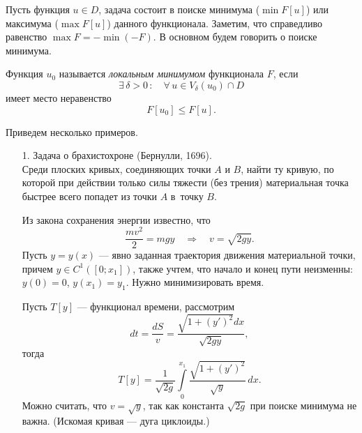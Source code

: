 \documentclass[12pt,a5paper]{book}
\begin{document}
	Пусть функция $u \in D$, задача состоит в поиске минимума ($\min{F[u]}$) или максимума ($\max{F[u]}$) данного функционала. Заметим, что справедливо равенство $\max{F} = -\min{(-F)}$. В основном будем говорить о поиске минимума.
	
	Функция $u_0$ называется \emph{локальным минимумом} функционала $F$, если
	\begin{equation*}
		\exists\,\delta > 0\,: \quad \forall\,u \in V_\delta(u_0) \cap D
	\end{equation*}
	имеет место неравенство
	\begin{equation*}
		F[u_0] \leq F[u].
	\end{equation*}

	Приведем несколько примеров.
	\begin{itemize}
		\item [1.] Задача о брахистохроне (Бернулли, 1696).\\
		Среди плоских кривых, соединяющих точки $A$ и $B$, найти ту кривую, по которой при действии только силы тяжести (без трения) материальная точка быстрее всего попадет из точки $A$ в~точку $B$.
		\begin{center}
		\end{center}
		Из закона сохранения энергии известно, что
		\begin{equation*}
			\frac{mv^2}{2} = mgy \quad \Rightarrow \quad v = \sqrt{2gy}.
		\end{equation*}	
		Пусть $y = y(x)$ --- явно заданная траектория движения материальной точки, причем $y \in C^1([0; x_1])$, также учтем, что начало и конец пути неизменны: $y(0) = 0$, $y(x_1) = y_1$. Нужно минимизировать время.
		
		Пусть $T[y]$ --- функционал времени, рассмотрим
		\begin{equation*}
			dt = \frac{dS}{v} = \frac{\sqrt{1+(y')^2}dx}{\sqrt{2gy}},
		\end{equation*}
		тогда
		\begin{equation*}
			T[y] = \frac{1}{\sqrt{2g}}\int\limits_0^{x_1} \frac{\sqrt{1 + (y')^2}}{\sqrt{y}}\,dx.
		\end{equation*}
		Можно считать, что $v = \sqrt{y}$, так как константа $\sqrt{2g}$ при поиске минимума не важна. (Искомая кривая --- дуга циклоиды.)
		

\end{itemize}
\end{document}
